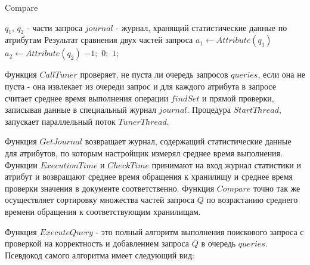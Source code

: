 \documentclass{matmex-diploma}
\begin{document}
        \begin{algorithm}[H]                   
        \caption{Compare}              
        \label{cmp1}                        
            \begin{algorithmic}        
                \REQUIRE $q_1$, $q_2$ - части запроса $journal$ - журнал, хранящий статистические данные по атрибутам
                \ENSURE Результат сравнения двух частей запроса
                \STATE $a_1 \leftarrow Attribute(q_1)$
                \STATE $a_2 \leftarrow Attribute(q_2)$
                    \RETURN $-1;$
                \ELSE 
                        \RETURN $0;$
                    \ELSE
                        \RETURN $1;$
                    \ENDIF
                \ENDIF
            \end{algorithmic}
        \end{algorithm}
        
        Функция $CallTuner$ проверяет, не пуста ли очередь запросов $queries$, если она не пуста - она извлекает из очереди запрос и для каждого атрибута в запросе считает среднее время выполнения операции $findSet$ и прямой проверки, записывая данные в специальный журнал $journal$. Процедура $StartThread$, запускает параллельный поток $TunerThread$.
        
        Функция $GetJournal$ возвращает журнал, содержащий статистические данные для атрибутов, по которым настройщик измерял среднее время выполнения. Функции $ExecutionTime$ и $CheckTime$ принимают на вход журнал статистики и атрибут и возвращают среднее время обращения к хранилищу и среднее время проверки значения в документе соответственно. Функция $Compare$ точно так же осуществляет сортировку множества частей запроса $Q$ по возрастанию среднего времени обращения к соответствующим хранилищам.
        
        Функция $ExecuteQuery$ - это полный алгоритм выполнения поискового запроса с проверкой на корректность и добавлением запроса $Q$ в очередь $queries$. Псевдокод самого алгоритма имеет следующий вид:
        
\end{document}
